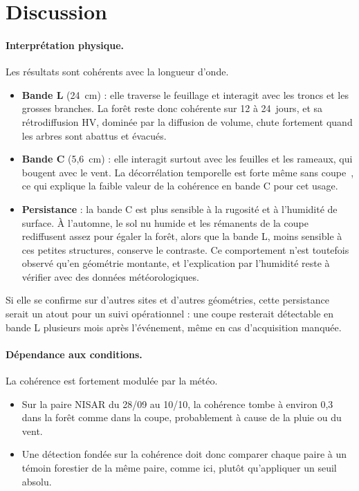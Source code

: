 \documentclass[11pt,a4paper]{article}
\begin{document}
\section{Discussion}

\paragraph{Interprétation physique.} Les résultats sont cohérents avec la longueur d'onde.
\begin{itemize}
\item \textbf{Bande L} (24~cm) : elle traverse le feuillage et interagit avec les troncs et les grosses branches.
  La forêt reste donc cohérente sur 12 à 24~jours, et sa rétrodiffusion HV, dominée par la diffusion de volume,
  chute fortement quand les arbres sont abattus et évacués.
\item \textbf{Bande C} (5,6~cm) : elle interagit surtout avec les feuilles et les rameaux, qui bougent avec le vent.
  La décorrélation temporelle est forte même sans coupe~\cite{zebker1992decorrelation}, ce qui explique la faible
  valeur de la cohérence en bande C pour cet usage.
\item \textbf{Persistance} : la bande C est plus sensible à la rugosité et à l'humidité de surface. À l'automne, le
  sol nu humide et les rémanents de la coupe rediffusent assez pour égaler la forêt, alors que la bande L, moins
  sensible à ces petites structures, conserve le contraste. Ce comportement n'est toutefois observé qu'en
  géométrie montante, et l'explication par l'humidité reste à vérifier avec des données météorologiques.
\end{itemize}
Si elle se confirme sur d'autres sites et d'autres géométries, cette persistance serait un atout pour un suivi
opérationnel : une coupe resterait détectable en bande L plusieurs mois après l'événement, même en cas
d'acquisition manquée.

\paragraph{Dépendance aux conditions.} La cohérence est fortement modulée par la météo.
\begin{itemize}
\item Sur la paire NISAR du 28/09 au 10/10, la cohérence tombe à environ 0,3 dans la forêt comme dans la coupe,
  probablement à cause de la pluie ou du vent.
\item Une détection fondée sur la cohérence doit donc comparer chaque paire à un témoin forestier de la même paire,
  comme ici, plutôt qu'appliquer un seuil absolu.
\end{itemize}
\end{document}
